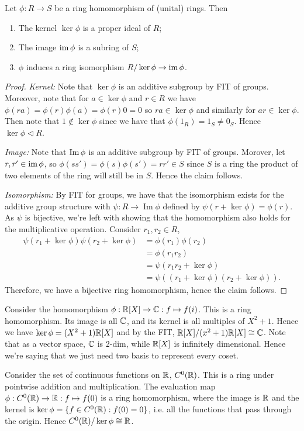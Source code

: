 \begin{theorem}
  Let $\phi:R\to S$ be a ring homomorphism of (unital) rings. Then
  \begin{enumerate}
    \item The kernel $\ker\phi$ is a proper ideal of $R$;
    \item The image $\operatorname{im}\phi$ is a subring of $S$;
    \item $\phi$ induces a ring isomorphism $R/\ker\phi \to \operatorname{im}\phi$.
  \end{enumerate}
\end{theorem}
\begin{proof}
  \emph{Kernel:} Note that $\ker\phi$ is an additive subgroup by FIT of groups. Moreover,
  note that for $a\in\ker\phi$ and $r\in R$ we have $\phi(ra)=\phi(r)\phi(a)=\phi(r)0=0$
  so $ra\in\ker\phi$ and similarly for $ar\in\ker\phi$. Then note that $1\not\in\ker \phi$
  since we have that $\phi(1_R)=1_S\neq 0_S$. Hence $\ker\phi\lhd R$.

  \emph{Image:} Note that $\operatorname{Im}\phi$ is an additive subgroup by FIT of groups. Morover, let
  $r,r'\in\operatorname{im}\phi$, so $\phi(ss')=\phi(s)\phi(s')=rr'\in S$ since $S$ is a ring the
  product of two elements of the ring will still be in $S$. Hence the claim follows.

  \emph{Isomorphism:} By FIT for groups, we have that the isomorphism exists for the
  additive group structure with $\psi:R\to \operatorname{Im} \phi$ defined by $\psi(r+\ker \phi)=\phi(r)$. As $\psi$ is bijective, we're left with showing that the homomorphism also holds for
  the multiplicative operation. Consider $r_1,r_2\in R$,
\begin{align*}
    \psi(r_1+\ker\phi)\psi(r_2+\ker\phi)&=\phi(r_1)\phi(r_2)
    \\&=\phi(r_1 r_2)
    \\&=\psi(r_1 r_2+\ker\phi)
    \\&=\psi((r_1+\ker\phi)(r_2+\ker\phi)).
\end{align*}
Therefore, we have a bijective ring homomorphism, hence the claim follows.
\end{proof}

\begin{example}
  Consider the homomorphism $\phi: \mathbb R[X]\to \mathbb C:f\mapsto f(i)$. This is a ring
  homomorphism. Its image is all $\mathbb C$, and its kernel is all multiples of $X^2+1$. Hence
  we have $\ker\phi=(X^2+1)\mathbb R[X]$ and by the FIT, $\mathbb R[X]/(x^2+1)\mathbb R[X]\cong \mathbb C$. Note
  that as a vector space, $\mathbb C$ is 2-dim, while $\mathbb R[X]$ is infinitely dimensional. Hence
  we're saying that we just need two basis to represent every coset. 
\end{example}
\begin{example}[In analysis]
  Consider the set of continuous functions on $\mathbb R$, $C^0(\mathbb R)$. This is a ring under
  pointwise addition and multiplication. The evaluation map $\phi:C^0(\mathbb R)\to \mathbb R:f\mapsto
  f(0)$ is a ring homomorphism, where the image is $\mathbb R$ and the kernel is
  $\ker\phi=\{f\in C^0(\mathbb R): f(0)=0\}$, i.e. all the functions that pass through the
  origin. Hence $C^0(\mathbb R)/\ker\phi \cong \mathbb R$.
\end{example}


